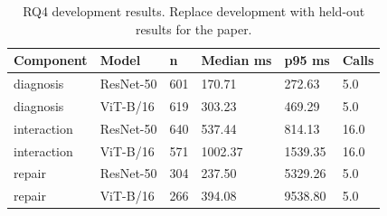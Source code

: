 \begin{table}[t]
\centering
\caption{RQ4 development results. Replace development with held-out results for the paper.}
\label{tab:rq4}
\begin{tabular}{llllll}
\toprule
Component & Model & n & Median ms & p95 ms & Calls \\
\midrule
diagnosis & ResNet-50 & 601 & 170.71 & 272.63 & 5.0 \\
diagnosis & ViT-B/16 & 619 & 303.23 & 469.29 & 5.0 \\
interaction & ResNet-50 & 640 & 537.44 & 814.13 & 16.0 \\
interaction & ViT-B/16 & 571 & 1002.37 & 1539.35 & 16.0 \\
repair & ResNet-50 & 304 & 237.50 & 5329.26 & 5.0 \\
repair & ViT-B/16 & 266 & 394.08 & 9538.80 & 5.0 \\
\bottomrule
\end{tabular}
\end{table}

